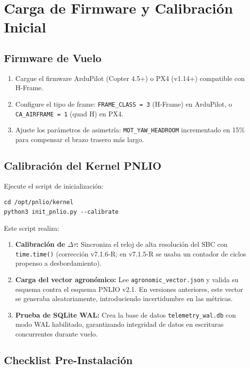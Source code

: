 \section{Carga de Firmware y Calibración Inicial}

\subsection{Firmware de Vuelo}

\begin{enumerate}
    \item Cargue el firmware ArduPilot (Copter 4.5+) o PX4 (v1.14+) compatible con H-Frame.
    \item Configure el tipo de frame: \texttt{FRAME\_CLASS = 3} (H-Frame) en ArduPilot, o \texttt{CA\_AIRFRAME = 1} (quad H) en PX4.
    \item Ajuste los parámetros de asimetría: \texttt{MOT\_YAW\_HEADROOM} incrementado en 15\% para compensar el brazo trasero más largo.
\end{enumerate}

\subsection{Calibración del Kernel PNLIO}

Ejecute el script de inicialización:

\begin{verbatim}
cd /opt/pnlio/kernel
python3 init_pnlio.py --calibrate
\end{verbatim}

Este script realiza:
\begin{enumerate}
    \item \textbf{Calibración de $\Delta\tau$:} Sincroniza el reloj de alta resolución del SBC con \texttt{time.time()} (corrección v7.1.6-R; en v7.1.5-R se usaba un contador de ciclos propenso a desbordamiento).
    \item \textbf{Carga del vector agronómico:} Lee \texttt{agronomic\_vector.json} y valida su esquema contra el esquema PNLIO v2.1. En versiones anteriores, este vector se generaba aleatoriamente, introduciendo incertidumbre en las métricas.
    \item \textbf{Prueba de SQLite WAL:} Crea la base de datos \texttt{telemetry\_wal.db} con modo WAL habilitado, garantizando integridad de datos en escrituras concurrentes durante vuelo.
\end{enumerate}

\subsection{Checklist Pre-Instalación}

